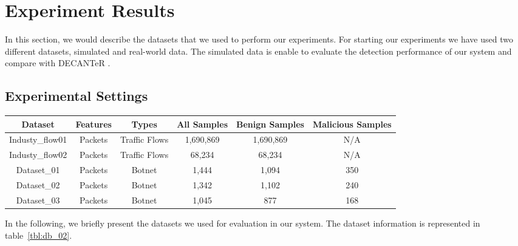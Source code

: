 \section{Experiment Results}

In this section, we would describe the datasets that we used to perform our experiments. For starting our experiments we have used two different datasets, simulated and real-world data. The simulated data is enable to evaluate the detection performance of our system and compare with DECANTeR \cite{bortolameotti2017decanter}.


\subsection{Experimental Settings}

\begin{table*}[!h]
\centering
\caption{Overview of the Datasets. We collect five datasets which industry series sets were real-world flows and the remaining of three were simulated data. Since the real-world traffic cannot be properly labeled, we treat real-world data as benign traffic. These data are captured by tcpdump and then using the scapy module to extract the HTTP header information we need.}
\label{tbl:db_02}
\begin{tabular}{|c|c|c|c|c|c|}
\hline\hline
Dataset         & Features & Types            & All Samples & Benign Samples & Malicious Samples \\ \hline
Industy\_flow01 & Packets  & Traffic Flows & 1,690,869   & 1,690,869  & N/A               \\ \hline
Industy\_flow02 & Packets  & Traffic Flows & 68,234   & 68,234   & N/A               \\ \hline
Dataset\_01     & Packets  & Botnet          & 1,444    & 1,094     & 350               \\ \hline
Dataset\_02     & Packets  & Botnet          & 1,342    & 1,102     & 240               \\ \hline
Dataset\_03     & Packets  & Botnet          & 1,045   &  877      & 168               \\ \hline\hline
\end{tabular}
\end{table*}


In the following, we briefly present the datasets we used for evaluation in our system. The dataset information is represented in table~\ref{tbl:db_02}.

